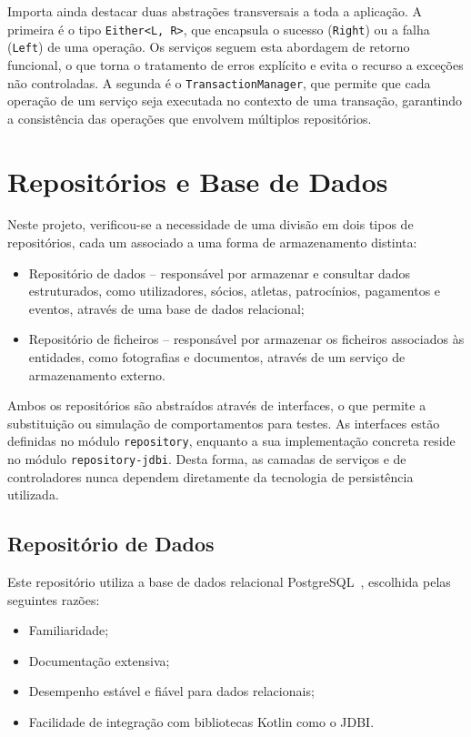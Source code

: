 Importa ainda destacar duas abstrações transversais a toda a aplicação. A 
primeira é o tipo \texttt{Either<L, R>}, que encapsula o sucesso 
(\texttt{Right}) ou a falha (\texttt{Left}) de uma operação. Os serviços 
seguem esta abordagem de retorno funcional, o que torna o tratamento de erros 
explícito e evita o recurso a exceções não controladas. A segunda é o 
\texttt{TransactionManager}, que permite que cada operação de um serviço seja 
executada no contexto de uma transação, garantindo a consistência das 
operações que envolvem múltiplos repositórios.


\section{Repositórios e Base de Dados}

Neste projeto, verificou-se a necessidade de uma divisão em dois tipos  de repositórios, cada um associado a uma forma de armazenamento distinta:

\begin{itemize}
    \item Repositório de dados -- responsável por armazenar e consultar dados 
    estruturados, como utilizadores, sócios, atletas, patrocínios, pagamentos 
    e eventos, através de uma base de dados relacional;
    \item Repositório de ficheiros -- responsável por armazenar os ficheiros 
    associados às entidades, como fotografias e documentos, através de um 
    serviço de armazenamento externo.
\end{itemize}

Ambos os repositórios são abstraídos através de interfaces, o que permite a substituição ou simulação de comportamentos para testes. As interfaces estão definidas no módulo \texttt{repository}, enquanto a sua implementação concreta 
reside no módulo \texttt{repository-jdbi}. Desta forma, as camadas de serviços e de controladores nunca dependem diretamente da tecnologia de persistência 
utilizada.

\subsection{Repositório de Dados}

Este repositório utiliza a base de dados relacional PostgreSQL~\cite{postgresql}, 
escolhida pelas seguintes razões:

\begin{itemize}
    \item Familiaridade;
    \item Documentação extensiva;
    \item Desempenho estável e fiável para dados relacionais;
    \item Facilidade de integração com bibliotecas Kotlin como o JDBI.
\end{itemize}

